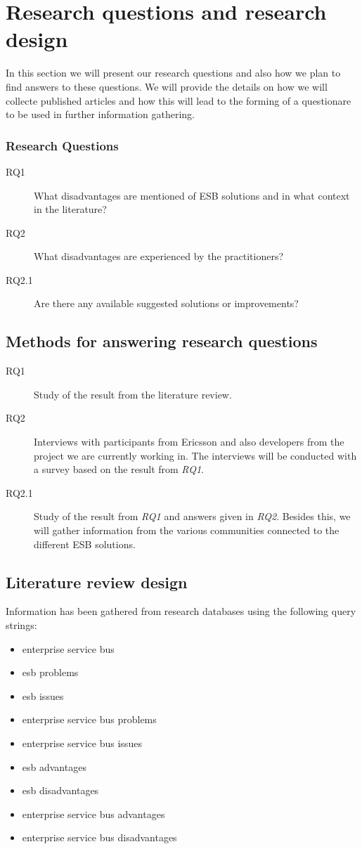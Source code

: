 \documentclass{llncs}
\begin{document}
\section{Research questions and research design}
In this section we will present our research questions and also how we plan to find answers to these questions. We will provide the details on how we will collecte published articles and how this will lead to the forming of a questionare to be used in further information gathering.
\subsubsection{Research Questions}

\begin{description}
\item[RQ1] What disadvantages are mentioned of ESB solutions and in what context in the literature?
\item[RQ2] What disadvantages are experienced by the practitioners?
\item[RQ2.1] Are there any available suggested solutions or improvements?
\end{description}

\subsection{Methods for answering research questions}

\begin{description}
\item[RQ1] Study of the result from the literature review.
\item[RQ2] Interviews with participants from Ericsson and also developers from the project we are currently working in. The interviews will be conducted with a survey based on the result from \emph{RQ1}.
\item[RQ2.1] Study of the result from \emph{RQ1} and answers given in \emph{RQ2}. Besides this, we will gather information from the various communities connected to the different ESB solutions.
\end{description}

\subsection{Literature review design}
Information has been gathered from research databases using the following query strings:
\begin{itemize}
\item enterprise service bus
\item esb problems
\item esb issues
\item enterprise service bus problems
\item enterprise service bus issues
\item esb advantages
\item esb disadvantages
\item enterprise service bus advantages
\item enterprise service bus disadvantages
\end{itemize}
\end{document}
